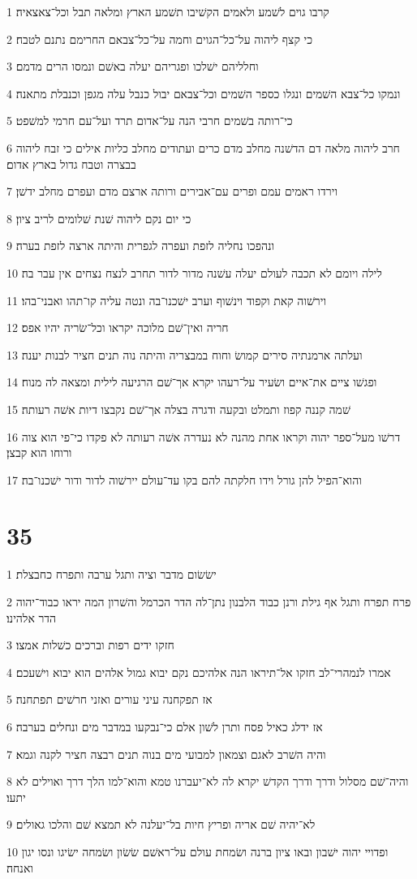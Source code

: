 \par 1 קרבו גוים לשׁמע ולאמים הקשׁיבו תשׁמע הארץ ומלאה תבל וכל־צאצאיה׃
\par 2 כי קצף ליהוה על־כל־הגוים וחמה על־כל־צבאם החרימם נתנם לטבח׃
\par 3 וחלליהם ישׁלכו ופגריהם יעלה באשׁם ונמסו הרים מדמם׃
\par 4 ונמקו כל־צבא השׁמים ונגלו כספר השׁמים וכל־צבאם יבול כנבל עלה מגפן וכנבלת מתאנה׃
\par 5 כי־רותה בשׁמים חרבי הנה על־אדום תרד ועל־עם חרמי למשׁפט׃
\par 6 חרב ליהוה מלאה דם הדשׁנה מחלב מדם כרים ועתודים מחלב כליות אילים כי זבח ליהוה בבצרה וטבח גדול בארץ אדום׃
\par 7 וירדו ראמים עמם ופרים עם־אבירים ורותה ארצם מדם ועפרם מחלב ידשׁן׃
\par 8 כי יום נקם ליהוה שׁנת שׁלומים לריב ציון׃
\par 9 ונהפכו נחליה לזפת ועפרה לגפרית והיתה ארצה לזפת בערה׃
\par 10 לילה ויומם לא תכבה לעולם יעלה עשׁנה מדור לדור תחרב לנצח נצחים אין עבר בה׃
\par 11 וירשׁוה קאת וקפוד וינשׁוף וערב ישׁכנו־בה ונטה עליה קו־תהו ואבני־בהו׃
\par 12 חריה ואין־שׁם מלוכה יקראו וכל־שׂריה יהיו אפס׃
\par 13 ועלתה ארמנתיה סירים קמושׂ וחוח במבצריה והיתה נוה תנים חציר לבנות יענה׃
\par 14 ופגשׁו ציים את־איים ושׂעיר על־רעהו יקרא אך־שׁם הרגיעה לילית ומצאה לה מנוח׃
\par 15 שׁמה קננה קפוז ותמלט ובקעה ודגרה בצלה אך־שׁם נקבצו דיות אשׁה רעותה׃
\par 16 דרשׁו מעל־ספר יהוה וקראו אחת מהנה לא נעדרה אשׁה רעותה לא פקדו כי־פי הוא צוה ורוחו הוא קבצן׃
\par 17 והוא־הפיל להן גורל וידו חלקתה להם בקו עד־עולם יירשׁוה לדור ודור ישׁכנו־בה׃

\chapter{35}

\par 1 ישׂשׂום מדבר וציה ותגל ערבה ותפרח כחבצלת׃
\par 2 פרח תפרח ותגל אף גילת ורנן כבוד הלבנון נתן־לה הדר הכרמל והשׁרון המה יראו כבוד־יהוה הדר אלהינו׃
\par 3 חזקו ידים רפות וברכים כשׁלות אמצו׃
\par 4 אמרו לנמהרי־לב חזקו אל־תיראו הנה אלהיכם נקם יבוא גמול אלהים הוא יבוא וישׁעכם׃
\par 5 אז תפקחנה עיני עורים ואזני חרשׁים תפתחנה׃
\par 6 אז ידלג כאיל פסח ותרן לשׁון אלם כי־נבקעו במדבר מים ונחלים בערבה׃
\par 7 והיה השׁרב לאגם וצמאון למבועי מים בנוה תנים רבצה חציר לקנה וגמא׃
\par 8 והיה־שׁם מסלול ודרך ודרך הקדשׁ יקרא לה לא־יעברנו טמא והוא־למו הלך דרך ואוילים לא יתעו׃
\par 9 לא־יהיה שׁם אריה ופריץ חיות בל־יעלנה לא תמצא שׁם והלכו גאולים׃
\par 10 ופדויי יהוה ישׁבון ובאו ציון ברנה ושׂמחת עולם על־ראשׁם שׂשׂון ושׂמחה ישׂיגו ונסו יגון ואנחה׃

